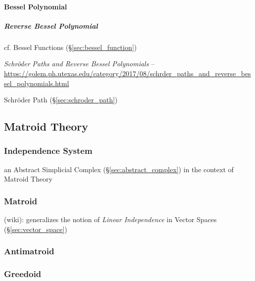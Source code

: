 \paragraph{Bessel Polynomial}\label{sec:bessel_polynomial}\hfill

\subparagraph{Reverse Bessel Polynomial}\label{sec:reverse_bessel_polynomial}
\hfill

cf. Bessel Functions (\S\ref{sec:bessel_function})

\emph{Schr\"oder Paths and Reverse Bessel Polynomials} --
\url{https://golem.ph.utexas.edu/category/2017/08/schrder_paths_and_reverse_bessel_polynomials.html}

Schr\"oder Path (\S\ref{sec:schroder_path})



\subsection{Matroid Theory}\label{sec:matroid_theory}

\subsubsection{Independence System}\label{sec:independence_system}

an Abstract Simplicial Complex (\S\ref{sec:abstract_complex}) in the context of
Matroid Theory



\subsubsection{Matroid}\label{sec:matroid}

(wiki): generalizes the notion of \emph{Linear Independence} in Vector Spaces
(\S\ref{sec:vector_space})



\subsubsection{Antimatroid}\label{sec:antimatroid}

\subsubsection{Greedoid}\label{sec:greedoid}



